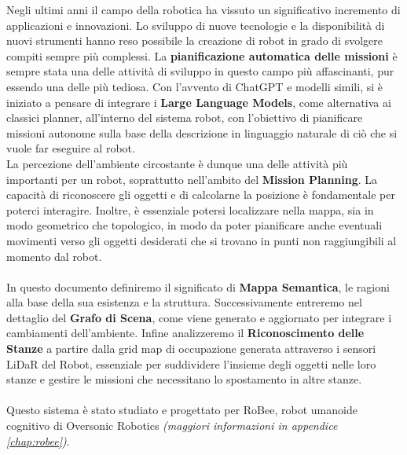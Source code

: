 
Negli ultimi anni il campo della robotica ha vissuto un significativo incremento di applicazioni e innovazioni. Lo sviluppo di nuove tecnologie e la disponibilità di nuovi strumenti hanno reso possibile la creazione di robot in grado di svolgere compiti sempre più complessi. La \textbf{pianificazione automatica delle missioni} è sempre stata una delle attività di sviluppo in questo campo più affascinanti, pur essendo una delle più tediosa. Con l'avvento di ChatGPT e modelli simili, si è iniziato a pensare di integrare i \textbf{Large Language Models}, come alternativa ai classici planner, all'interno del sistema robot, con l'obiettivo di pianificare missioni autonome sulla base della descrizione in linguaggio naturale di ciò che si vuole far eseguire al robot.\\
La percezione dell'ambiente circostante è dunque una delle attività più importanti per un robot, soprattutto nell'ambito del \textbf{Mission Planning}. La capacità di riconoscere gli oggetti e di calcolarne la posizione è fondamentale per poterci interagire. Inoltre, è essenziale potersi localizzare nella mappa, sia in modo geometrico che topologico, in modo da poter pianificare anche eventuali movimenti verso gli oggetti desiderati che si trovano in punti non raggiungibili al momento dal robot.\\\\
In questo documento definiremo il significato di \textbf{Mappa Semantica}, le ragioni alla base della sua esistenza e la struttura. %
Successivamente entreremo nel dettaglio del \textbf{Grafo di Scena}, come viene generato e aggiornato per integrare i cambiamenti dell'ambiente. Infine analizzeremo il \textbf{Riconoscimento delle Stanze} a partire dalla grid map di occupazione generata attraverso i sensori LiDaR del Robot, essenziale per suddividere l'insieme degli oggetti nelle loro stanze e gestire le missioni che necessitano lo spostamento in altre stanze.\\\\
Questo sistema è stato studiato e progettato per RoBee, robot umanoide cognitivo di Oversonic Robotics \textit{(maggiori informazioni in appendice \ref{chap:robee})}.